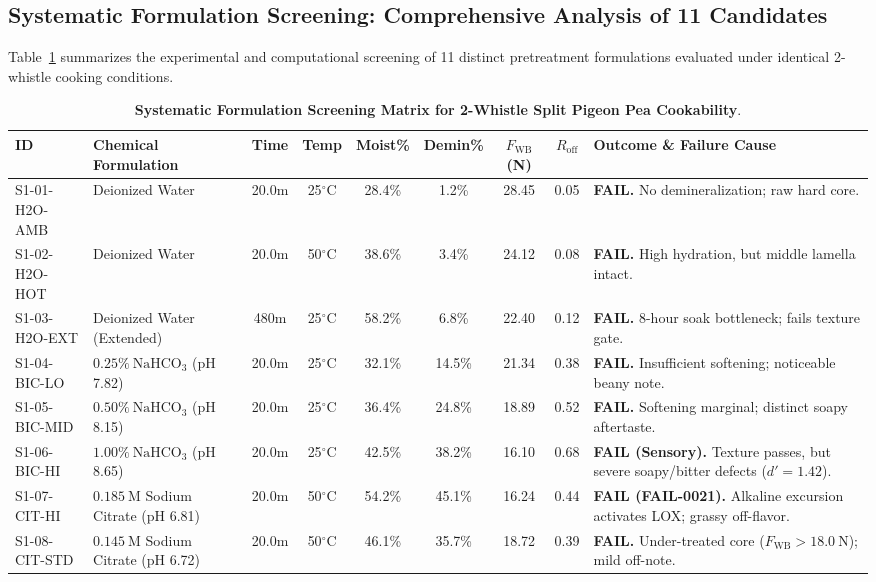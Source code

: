 \documentclass[10pt,a4paper]{article}
\begin{document}
\subsection{Systematic Formulation Screening: Comprehensive Analysis of 11 Candidates}
Table~\ref{tab:screening_11_exp} summarizes the experimental and computational screening of 11 distinct pretreatment formulations evaluated under identical 2-whistle cooking conditions.

\begin{table}[H]
\centering
\footnotesize
\setlength{\tabcolsep}{3.0pt}
\caption{\textbf{Systematic Formulation Screening Matrix for 2-Whistle Split Pigeon Pea Cookability}.}
\label{tab:screening_11_exp}
\begin{tabularx}{\linewidth}{p{2.1cm}p{3.8cm}cccccc>{\raggedright\arraybackslash}X}
\toprule
\textbf{ID} & \textbf{Chemical Formulation} & \textbf{Time} & \textbf{Temp} & \textbf{Moist\%} & \textbf{Demin\%} & \textbf{$F_{\mathrm{WB}}$ (N)} & \textbf{$R_{\mathrm{off}}$} & \textbf{Outcome \& Failure Cause} \\
\midrule
S1-01-H2O-AMB & Deionized Water & 20.0m & 25$^\circ$C & 28.4\% & 1.2\% & 28.45 & 0.05 & \textbf{FAIL.} No demineralization; raw hard core. \\
S1-02-H2O-HOT & Deionized Water & 20.0m & 50$^\circ$C & 38.6\% & 3.4\% & 24.12 & 0.08 & \textbf{FAIL.} High hydration, but middle lamella intact. \\
S1-03-H2O-EXT & Deionized Water (Extended) & 480m & 25$^\circ$C & 58.2\% & 6.8\% & 22.40 & 0.12 & \textbf{FAIL.} 8-hour soak bottleneck; fails texture gate. \\
S1-04-BIC-LO  & $0.25\%\ \mathrm{NaHCO}_3$ (pH 7.82) & 20.0m & 25$^\circ$C & 32.1\% & 14.5\% & 21.34 & 0.38 & \textbf{FAIL.} Insufficient softening; noticeable beany note. \\
S1-05-BIC-MID & $0.50\%\ \mathrm{NaHCO}_3$ (pH 8.15) & 20.0m & 25$^\circ$C & 36.4\% & 24.8\% & 18.89 & 0.52 & \textbf{FAIL.} Softening marginal; distinct soapy aftertaste. \\
S1-06-BIC-HI  & $1.00\%\ \mathrm{NaHCO}_3$ (pH 8.65) & 20.0m & 25$^\circ$C & 42.5\% & 38.2\% & 16.10 & 0.68 & \textbf{FAIL (Sensory).} Texture passes, but severe soapy/bitter defects ($d'=1.42$). \\
S1-07-CIT-HI  & $0.185\ \mathrm{M}$ Sodium Citrate (pH 6.81) & 20.0m & 50$^\circ$C & 54.2\% & 45.1\% & 16.24 & 0.44 & \textbf{FAIL (FAIL-0021).} Alkaline excursion activates LOX; grassy off-flavor. \\
S1-08-CIT-STD & $0.145\ \mathrm{M}$ Sodium Citrate (pH 6.72) & 20.0m & 50$^\circ$C & 46.1\% & 35.7\% & 18.72 & 0.39 & \textbf{FAIL.} Under-treated core ($F_{\mathrm{WB}} > 18.0\ \mathrm{N}$); mild off-note. \\

\end{tabularx}
\end{table}
\end{document}
